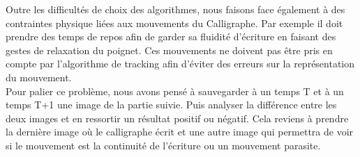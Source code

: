 Outre les difficult\'es de choix des algorithmes, nous faisons face \'egalement à des contraintes physique li\'ees aux mouvements du Calligraphe. Par exemple il doit prendre des temps de repos afin de garder sa fluidit\'e d'\'ecriture en faisant des gestes de relaxation du poignet. Ces mouvements ne doivent pas \^etre pris en compte par l'algorithme de tracking afin d'\'eviter des erreurs sur la repr\'esentation du mouvement. \\

Pour palier ce probl\`eme, nous avons pens\'e \`a sauvegarder \`a un temps T et \`a un temps T+1 une image de la partie suivie. Puis analyser la diff\'erence entre les deux images et en ressortir un r\'esultat positif ou n\'egatif. Cela reviens \`a prendre la derni\`ere image o\`u le calligraphe \'ecrit et une autre image qui permettra de voir si le mouvement est la continuit\'e de l'\'ecriture ou un mouvement parasite.